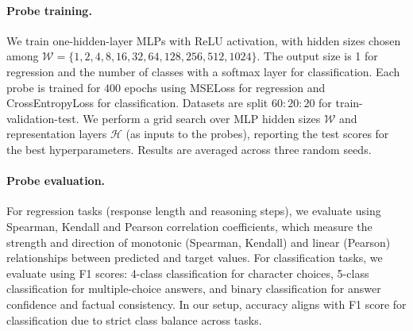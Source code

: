     \paragraph{Probe training.} We train one-hidden-layer MLPs with ReLU activation, with hidden sizes chosen among $\mathcal{W} = \{1, 2, 4, 8, 16, 32, 64, 128, 256, 512, 1024\}$. 
    The output size is 1 for regression and the number of classes with a softmax layer for classification. 
    Each probe is trained for $400$ epochs using MSELoss for regression and CrossEntropyLoss for classification. Datasets are split $60:20:20$ for train-validation-test. We perform a grid search over MLP hidden sizes $\mathcal{W}$ and representation layers $\mathcal{H}$ (as inputs to the probes), reporting the test scores for the best hyperparameters. Results are averaged across three random seeds.
    
    \paragraph{Probe evaluation.} For regression tasks (response length and reasoning steps), we evaluate using Spearman, Kendall and Pearson correlation coefficients, which measure the strength and direction of monotonic (Spearman, Kendall) and linear (Pearson) relationships between predicted and target values. For classification tasks, we evaluate using F1 scores: 4-class classification for character choices, 5-class classification for multiple-choice answers, and binary classification for answer confidence and factual consistency. 
    In our setup, accuracy aligns with F1 score for classification due to strict class balance across tasks.
    
